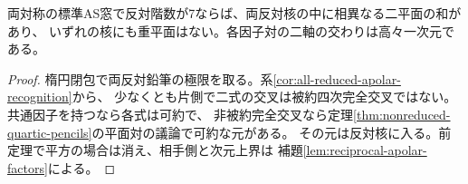 \begin{corollary}[階数7に残る可約因子]\label{cor:rank-seven-distinct-factors}
両対称の標準AS窓で反対階数が7ならば、両反対核の中に相異なる二平面の和があり、
いずれの核にも重平面はない。各因子対の二軸の交わりは高々一次元である。
\end{corollary}
\begin{proof}
楕円閉包で両反対鉛筆の極限を取る。系\ref{cor:all-reduced-apolar-recognition}から、
少なくとも片側で二式の交叉は被約四次完全交叉ではない。共通因子を持つなら各式は可約で、
非被約完全交叉なら定理\ref{thm:nonreduced-quartic-pencils}の平面対の議論で可約な元がある。
その元は反対核に入る。前定理で平方の場合は消え、相手側と次元上界は
補題\ref{lem:reciprocal-apolar-factors}による。
\end{proof}
